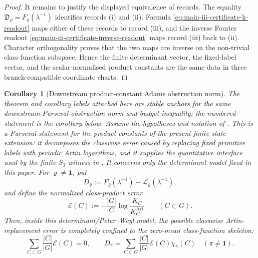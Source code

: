 \documentclass[11pt,a4paper]{amsart}
\theoremstyle{plain}
\newtheorem{corollary}[theorem]{Corollary}
\theoremstyle{definition}
\theoremstyle{remark}
\begin{document}
\begin{proof}
  It remains to justify the displayed equivalence of records.  The equality
  \(\mathfrak D_\varrho=F_\varrho(\lambda^{-1})\) identifies records
  \textup{(i)} and \textup{(ii)}.  Formula
  \eqref{eq:main-iii-certificate-k-readout} maps either of these records to
  record \textup{(iii)}, and the inverse Fourier readout
  \eqref{eq:main-iii-certificate-inverse-readout} maps record \textup{(iii)}
  back to \textup{(ii)}.  Character orthogonality proves that the two maps are
  inverse on the non-trivial class-function subspace.  Hence the finite
  determinant vector, the fixed-label vector, and the scalar-normalised product
  constants are the same data in three branch-compatible coordinate charts.
\end{proof}

\begin{corollary}[Downstream product-constant Adams obstruction norm]
  \label{thm:adams-obstruction-bound}
  \label{cor:adams-obstruction-bound}
  \label{thm:adams-obstruction-budget}
  \label{cor:adams-obstruction-budget}
  The theorem and corollary labels attached here are stable anchors for the
  same downstream Parseval obstruction norm and budget inequality; the
  numbered statement is the corollary below.
  Assume the hypotheses and notation of
  .  This is a Parseval statement for
  the product constants of the present finite-state extension: it decomposes
  the classwise error caused by replacing fixed primitive labels with
  periodic Artin logarithms, and it supplies the quantitative interface used
  by the finite \(S_3\) witness in
  .
  It concerns only the determinant model fixed in this paper.  For
  \(\varrho\neq\mathbf1\), put
  \[
    D_\varrho
    :=F_\varrho(\lambda^{-1})-\mathcal L_\varrho(\lambda^{-1}),
  \]
  and define the normalized class-product error
  \[
    \mathcal E(C)
    :=-
      \frac{|G|}{|C|}
      \log\frac{K_C}{K_C^{\mathrm{Art}}}
      \qquad(C\subset G).
  \]
  Then, inside this determinant/Peter--Weyl model, the possible classwise
  Artin-replacement error is completely confined to the zero-mean
  class-function skeleton:
  \begin{equation}\label{eq:adams-obstruction-bound-zero-mean}
    \sum_{C\subset G}\frac{|C|}{|G|}\mathcal E(C)=0,
    \qquad
    D_\pi=
    \sum_{C\subset G}\frac{|C|}{|G|}\mathcal E(C)\chi_\pi(C)
    \quad(\pi\neq\mathbf1).
  \end{equation}

\end{corollary}
\end{document}
